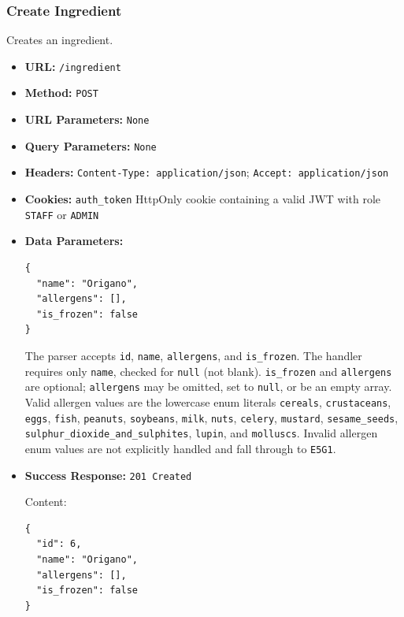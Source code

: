 \subsubsection*{Create Ingredient}

Creates an ingredient.

\begin{itemize}[nosep]
\item \textbf{URL:} \texttt{/ingredient}

\item \textbf{Method:} \texttt{POST}

\item \textbf{URL Parameters:} \texttt{None}

\item \textbf{Query Parameters:} \texttt{None}

\item \textbf{Headers:} \texttt{Content-Type: application/json}; \texttt{Accept: application/json}

\item \textbf{Cookies:} \texttt{auth\_token} HttpOnly cookie containing a valid JWT with role \texttt{STAFF} or \texttt{ADMIN}

\item \textbf{Data Parameters:}

\begin{lstlisting}
{
  "name": "Origano",
  "allergens": [],
  "is_frozen": false
}
\end{lstlisting}

The parser accepts \texttt{id}, \texttt{name}, \texttt{allergens}, and \texttt{is\_frozen}. The handler requires only \texttt{name}, checked for \texttt{null} (not blank). \texttt{is\_frozen} and \texttt{allergens} are optional; \texttt{allergens} may be omitted, set to \texttt{null}, or be an empty array. Valid allergen values are the lowercase enum literals \texttt{cereals}, \texttt{crustaceans}, \texttt{eggs}, \texttt{fish}, \texttt{peanuts}, \texttt{soybeans}, \texttt{milk}, \texttt{nuts}, \texttt{celery}, \texttt{mustard}, \texttt{sesame\_seeds}, \texttt{sulphur\_dioxide\_and\_sulphites}, \texttt{lupin}, and \texttt{molluscs}. Invalid allergen enum values are not explicitly handled and fall through to \texttt{E5G1}.

\item \textbf{Success Response:} \texttt{201 Created}

Content:

\begin{lstlisting}
{
  "id": 6,
  "name": "Origano",
  "allergens": [],
  "is_frozen": false
}
\end{lstlisting}


\end{itemize}
